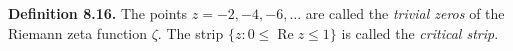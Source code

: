 \textbf{Definition 8.16.} The points $z = -2, -4, -6, \ldots$ are called the \textit{trivial zeros} of the Riemann zeta function $\zeta$. The strip $\{z : 0 \leq \operatorname{Re} z \leq 1\}$ is called the \textit{critical strip}.
